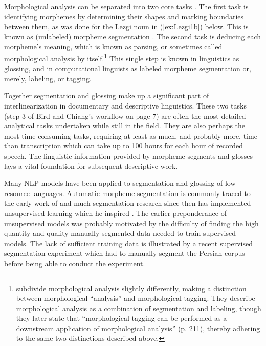Morphological analysis can be separated into two core tasks \citep{cotterell_labeled_2015,hammarstrom_unsupervised_2011,nicolai_morphological_2017,palmer_semi-automated_2009}. The first task is identifying morphemes by determining their shapes and marking boundaries between them, as was done for the Lezgi noun in (\ref{ex:Lezgi1b}) below. This is known as (unlabeled) morpheme segmentation \citep{creutz_unsupervised_2007,snyder_unsupervised_2008}. The second task is deducing each morpheme's meaning, which is known as parsing, or sometimes called morphological analysis by itself.\footnote{\citet{nicolai_morphological_2017} subdivide morphological analysis slightly differently, making a distinction between morphological “analysis” and morphological tagging. They describe morphological analysis as a combination of segmentation and labeling, though they later state that ``morphological tagging can be performed as a downstream application of morphological analysis'' (p. 211), thereby adhering to the same two distinctions described above.} This single step is known in linguistics as glossing, and in computational linguists as labeled morpheme segmentation or, merely, labeling, or tagging. 

Together segmentation and glossing make up a significant part of interlinearization in documentary and descriptive linguistics. These two tasks (step 3 of Bird and Chiang's workflow on page 7) are often the most detailed analytical tasks undertaken while still in the field. They are also perhaps the most time-consuming tasks, requiring at least as much, and probably more, time than transcription which can take up to 100 hours for each hour of recorded speech. The linguistic information provided by morpheme segments and glosses lays a vital foundation for subsequent descriptive work.

Many NLP models have been applied to segmentation and glossing of low-resource languages. Automatic morpheme segmentation is commonly traced to the early work of \citet{harris_phoneme_1955} and much segmentation research since then has implemented unsupervised learning which he inspired \citep{goldsmith_unsupervised_2001,creutz_unsupervised_2002,poon_unsupervised_2009}. The earlier preponderance of unsupervised models was probably motivated by the difficulty of finding the high quantity and quality manually segmented data needed to train supervised models. The lack of sufficient training data is illustrated by a recent supervised segmentation experiment \citep{ansari_supervised_2019} which had to manually segment the Persian corpus before being able to conduct the experiment. 

